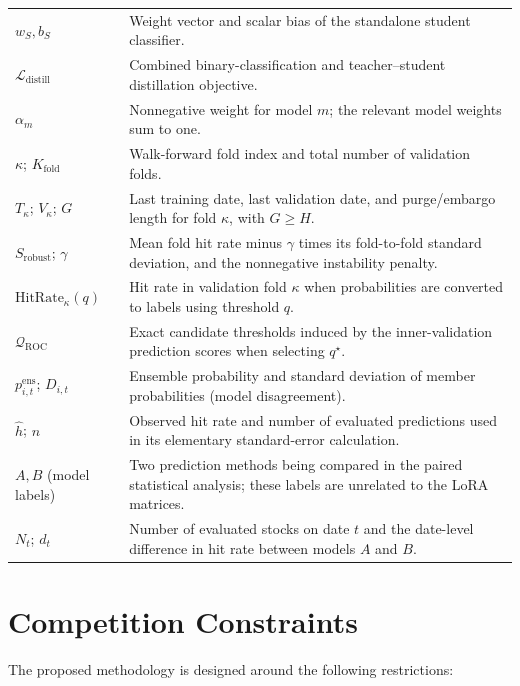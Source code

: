 \documentclass[11pt]{article}
\begin{document}
{\begin{longtable}{@{}p{}p{}@{}}
$w_S,b_S$ & Weight vector and scalar bias of the standalone student classifier. \\
$\mathcal L_{\mathrm{distill}}$ & Combined binary-classification and teacher--student distillation objective. \\
$\alpha_m$ & Nonnegative weight for model $m$; the relevant model weights sum to one. \\
$\kappa$; $K_{\mathrm{fold}}$ & Walk-forward fold index and total number of validation folds. \\
$T_\kappa$; $V_\kappa$; $G$ & Last training date, last validation date, and purge/embargo length for fold $\kappa$, with $G\geq H$. \\
$S_{\mathrm{robust}}$; $\gamma$ & Mean fold hit rate minus $\gamma$ times its fold-to-fold standard deviation, and the nonnegative instability penalty. \\
$\mathrm{HitRate}_\kappa(q)$ & Hit rate in validation fold $\kappa$ when probabilities are converted to labels using threshold $q$. \\
$\mathcal Q_{\mathrm{ROC}}$ & Exact candidate thresholds induced by the inner-validation prediction scores when selecting $q^\star$. \\
$p^{\mathrm{ens}}_{i,t}$; $D_{i,t}$ & Ensemble probability and standard deviation of member probabilities (model disagreement). \\
$\widehat h$; $n$ & Observed hit rate and number of evaluated predictions used in its elementary standard-error calculation. \\
$A,B$ (model labels) & Two prediction methods being compared in the paired statistical analysis; these labels are unrelated to the LoRA matrices. \\
$N_t$; $d_t$ & Number of evaluated stocks on date $t$ and the date-level difference in hit rate between models $A$ and $B$. \\
\bottomrule
\end{longtable}
}

\section{Competition Constraints}

The proposed methodology is designed around the following restrictions:
\end{document}
